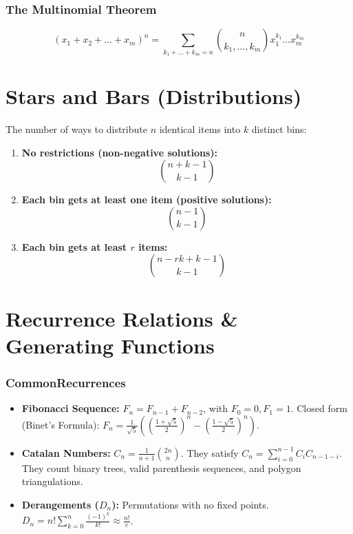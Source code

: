 \documentclass[11pt]{article}
\begin{document}
\section{The Multinomial Theorem}
\[
 (x_1 + x_2 + \dots + x_m)^n = \sum_{k_1 + \dots + k_m = n} \binom{n}{k_1, \dots, k_m} x_1^{k_1} \dots x_m^{k_m} 
\]

\hrulefill

\part{Stars and Bars (Distributions)}

The number of ways to distribute \(n\) identical items into \(k\) distinct bins:
\begin{enumerate}
    \item \textbf{No restrictions (non-negative solutions):}
    \[
 \binom{n + k - 1}{k - 1} 
\]
    \item \textbf{Each bin gets at least one item (positive solutions):}
    \[
 \binom{n - 1}{k - 1} 
\]
    \item \textbf{Each bin gets at least \(r\) items:}
    \[
 \binom{n - rk + k - 1}{k - 1} 
\]
\end{enumerate}

\hrulefill

\part{Recurrence Relations \& Generating Functions}

\section{CommonRecurrences}
\begin{itemize}
    \item \textbf{Fibonacci Sequence:} \(F_n = F_{n-1} + F_{n-2}\), with \(F_0=0, F_1=1\). Closed form (Binet's Formula): \(F_n = \frac{1}{\sqrt{5}}\left(\left(\frac{1+\sqrt{5}}{2}\right)^n - \left(\frac{1-\sqrt{5}}{2}\right)^n\right)\).
    \item \textbf{Catalan Numbers:} \(C_n = \frac{1}{n+1}\binom{2n}{n}\). They satisfy \(C_n = \sum_{i=0}^{n-1} C_i C_{n-1-i}\). They count binary trees, valid parenthesis sequences, and polygon triangulations.
    \item \textbf{Derangements (\(D_n\)):} Permutations with no fixed points. \(D_n = n! \sum_{k=0}^n \frac{(-1)^k}{k!} \approx \frac{n!}{e}\).
\end{itemize}
\end{document}
